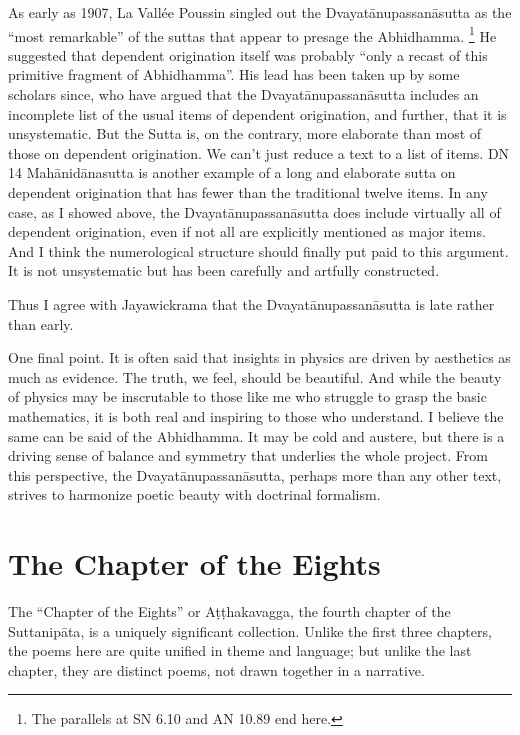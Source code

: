 \documentclass[12pt,openany]{book}%
\begin{document}
As early as 1907, La Vallée Poussin singled out the \textsanskrit{Dvayatānupassanāsutta} as the “most remarkable” of the suttas that appear to presage the Abhidhamma. \footnote{The parallels at SN 6.10 and AN 10.89 end here. } He suggested that dependent origination itself was probably “only a recast of this primitive fragment of Abhidhamma”. His lead has been taken up by some scholars since, who have argued that the \textsanskrit{Dvayatānupassanāsutta} includes an incomplete list of the usual items of dependent origination, and further, that it is unsystematic. But the Sutta is, on the contrary, more elaborate than most of those on dependent origination. We can’t just reduce a text to a list of items. DN 14 \textsanskrit{Mahānidānasutta} is another example of a long and elaborate sutta on dependent origination that has fewer than the traditional twelve items. In any case, as I showed above, the \textsanskrit{Dvayatānupassanāsutta} does include virtually all of dependent origination, even if not all are explicitly mentioned as major items. And I think the numerological structure should finally put paid to this argument. It is not unsystematic but has been carefully and artfully constructed.

Thus I agree with Jayawickrama that the \textsanskrit{Dvayatānupassanāsutta} is late rather than early.

One final point. It is often said that insights in physics are driven by aesthetics as much as evidence. The truth, we feel, should be beautiful. And while the beauty of physics may be inscrutable to those like me who struggle to grasp the basic mathematics, it is both real and inspiring to those who understand. I believe the same can be said of the Abhidhamma. It may be cold and austere, but there is a driving sense of balance and symmetry that underlies the whole project. From this perspective, the \textsanskrit{Dvayatānupassanāsutta}, perhaps more than any other text, strives to harmonize poetic beauty with doctrinal formalism.

\section*{The Chapter of the Eights}

The “Chapter of the Eights” or \textsanskrit{Aṭṭhakavagga}, the fourth chapter of the \textsanskrit{Suttanipāta}, is a uniquely significant collection. Unlike the first three chapters, the poems here are quite unified in theme and language; but unlike the last chapter, they are distinct poems, not drawn together in a narrative.
\end{document}
